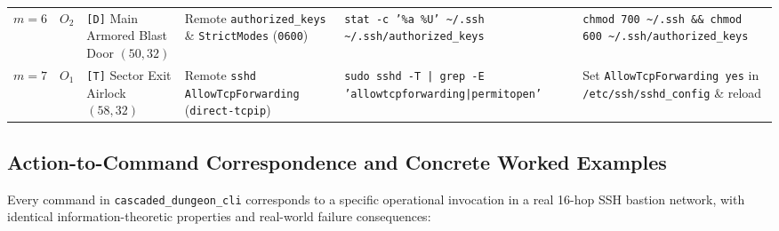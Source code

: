 \documentclass[11pt,a4paper]{article}
\theoremstyle{definition}
\theoremstyle{remark}
\begin{document}
\begin{table}[H]
\begin{tabular}{@{}ccp{2.6cm}p{3.4cm}p{4.3cm}p{3.4cm}@{}}
$m=6$ & $O_2$ & \texttt{[D]} Main Armored Blast Door $(50,32)$ & Remote \texttt{authorized\_keys} \& \texttt{StrictModes} (\texttt{0600}) & \texttt{stat -c '\%a \%U' \textasciitilde/.ssh \textasciitilde/.ssh/authorized\_keys} & \texttt{chmod 700 \textasciitilde/.ssh \&\& chmod 600 \textasciitilde/.ssh/authorized\_keys} \\
$m=7$ & $O_1$ & \texttt{[T]} Sector Exit Airlock $(58,32)$ & Remote \texttt{sshd} \texttt{AllowTcpForwarding} (\texttt{direct-tcpip}) & \texttt{sudo sshd -T | grep -E 'allowtcpforwarding|permitopen'} & Set \texttt{AllowTcpForwarding yes} in \texttt{/etc/ssh/sshd\_config} \& reload \\
\bottomrule
\end{tabular}
\end{table}

\subsection{Action-to-Command Correspondence and Concrete Worked Examples}

Every command in \texttt{cascaded\_dungeon\_cli} corresponds to a specific operational invocation in a real 16-hop SSH bastion network, with identical information-theoretic properties and real-world failure consequences:
\end{document}
